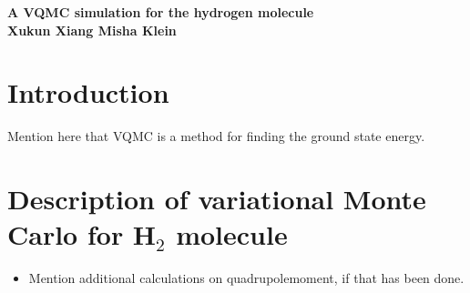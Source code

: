 \documentclass[a4paper,10pt]{article}
\begin{document}
\begin{center}
{\bf \Large A VQMC simulation for the hydrogen molecule} \\
\vspace{10pt}
{\bf Xukun Xiang \quad Misha Klein}
\end{center}

\begin{abstract}
 A NICE ABSTRACT 
\end{abstract}

\section{Introduction}

Mention here that VQMC is a method for finding the ground state energy. 

\section{Description of variational Monte Carlo for H$_{2}$ molecule}
	  \begin{itemize}
	   \item Mention additional calculations on quadrupolemoment, if that has been done. 
	   \end{itemize}
\end{document}
